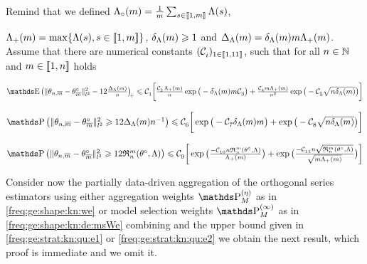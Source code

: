 \begin{as}\label{freq:ge:strat:kn:qu:as}
Remind that we defined $\oiSv=\tfrac{1}{\Di}\sum_{s\in\nset{1,\Di}}\iSv[s]$,

$\miSv= \max\{\iSv[s],s\in\nset{1,\Di}\}$, $\cmSv\geq1$ and $\DipenSv=\cmSv\Di \miSv$.
Assume that there are numerical constants $(\cst{i})_{1 \in \llbracket 1, 11 \rrbracket}$, such that for all $\ssY\in\Nz$ and $\Di\in\nset{1,\ssY}$ holds
  \begin{resListeN}[]
  \item\label{freq:ge:strat:kn:qu:as:i}
    $\E \vectp{\Vnormlp{\txdfPr-\xdfPr}^2 - 12\tfrac{\DipenSv}{\ssY}}  \leq 
    \cst{1} \bigg[\tfrac{\cst{2} \, \miSv}{\ssY}\exp\big(-\cmSv\Di\cst{3} \big)+\tfrac{\cst{4}\Di\miSv}{n^2}\exp\big(- \cst{5} \sqrt{n\cmSv}\big) \bigg]$
  \item\label{freq:ge:strat:kn:qu:as:ii}
    $\P\big(\Vnormlp{\txdfPr-\xdfPr}^2 \geq 12\DipenSv\ssY^{-1}\big)\leq 
    \cst{6} \bigg[\exp\big(-\cst{7} \cmSv\Di\big)
    +\exp\big(-\cst{8} \sqrt{\ssY\cmSv}\big)\bigg]$
  \item\label{freq:ge:strat:kn:qu:as:iii}
    $\P\big(\Vnormlp{\txdfPr-\xdfPr}^2 \geq 12\daRa{\Di}{(\xdf,\Lambda)}\big)\leq 
    \cst{9} \bigg[\exp\big(\tfrac{-\cst{10} \ssY\daRa{\Di}{(\xdf,\Lambda)}}{\miSv}\big)
    +\exp\big(\tfrac{-\cst{11} \ssY\sqrt{\daRa{\Di}{(\xdf,\Lambda)}}}{\sqrt{\Di\miSv}}\big)\bigg]$
  \end{resListeN}
\end{as}

\begin{te} Consider now the partially data-driven aggregation of the
  orthogonal series estimators using either  aggregation weights $\rWe[]$
  as in \eqref{freq:ge:shape:kn:we} or model selection weights $\msWe[]$ as in \eqref{freq:ge:shape:kn:de:msWe}
  combining  and the upper bound given
  in \eqref{freq:ge:strat:kn:qu:e1}  or \eqref{freq:ge:strat:kn:qu:e2} we obtain the next result, which proof is immediate and we omit it.
\end{te}

